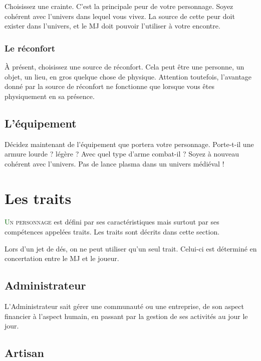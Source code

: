 \documentclass[twoside,12pt,english]{book}
\newcommand*\initfamily{\usefont{U}{Acorn}{xl}{n}}
\begin{document}
Choisissez une crainte. C'est la principale peur de votre personnage. Soyez cohérent avec l'univers dans lequel vous vivez. La source de cette peur doit exister dans l'univers, et le MJ doit pouvoir l'utiliser à votre encontre.

\subsubsection*{Le réconfort}

À présent, choisissez une source de réconfort. Cela peut être une personne, un objet, un lieu, en gros quelque chose de physique. Attention toutefois, l'avantage donné par la source de réconfort ne fonctionne que lorsque vous êtes physiquement en sa présence.

\subsection{L'équipement}

Décidez maintenant de l'équipement que portera votre personnage. Porte-t-il une armure lourde ? légère ? Avec quel type d'arme combat-il ? Soyez à nouveau cohérent avec l'univers. Pas de lance plasma dans un univers médiéval !

\newpage

\section{Les traits}

\lettrine[lines=3]{\initfamily\textcolor{darkgreen}{U}}{n personnage} est défini par ses caractéristiques mais surtout par ses compétences appelées traits. Les traits sont décrits dans cette section.

Lors d'un jet de dés, on ne peut utiliser qu'un seul trait. Celui-ci est déterminé en concertation entre le MJ et le joueur.

\subsection*{Administrateur}

L'Administrateur sait gérer une communauté ou une entreprise, de son aspect financier à l'aspect humain, en passant par la gestion de ses activités au jour le jour.

\subsection*{Artisan}
\end{document}
